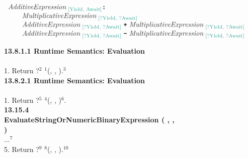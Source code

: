 \begin{figure}
  \centering
  \begin{subfigure}{\textwidth}
    \[
      \begin{array}{l}
        \esntp{AdditiveExpression}{Yield, Await} \est{:}\\

        \qquad \esntp{MultiplicativeExpression}{?Yield, ?Await}\\

        \qquad \esntp{AdditiveExpression}{?Yield, ?Await} \; \est{+} \;
        \esntp{MultiplicativeExpression}{?Yield, ?Await}\\

        \qquad \esntp{AdditiveExpression}{?Yield, ?Await} \; \est{-} \;
        \esntp{MultiplicativeExpression}{?Yield, ?Await}\\
      \end{array}
    \]
  \end{subfigure}
  \par\bigskip
  \begin{subfigure}{\textwidth}
    \textbf{13.8.1.1 Runtime Semantics: Evaluation}
    \\%
     \est{:}  \est{+}
    \vspace*{.5em}\\%
    1. Return ?${}^{2}$
    ${}^{1}$(,
    \escode{+}, ).${}^{3}$
    \\%

    \textbf{13.8.2.1 Runtime Semantics: Evaluation}
    \vspace*{.5em}\\%
     \est{:}  \est{-}
    \vspace*{.5em}\\%
    1. Return ?${}^{5}$
    ${}^{4}$(,
    \escode{-}, )${}^{6}$.
    \\%

    \textbf{13.15.4 EvaluateStringOrNumericBinaryExpression (
      ,
      ,
    )}
    \vspace*{.5em}\\%
    ...${}^{7}$
    \\%
    5. Return ?${}^{9}$ ${}^{8}$(,
    , ).${}^{10}$
    \\%


\end{subfigure}
\end{figure}
